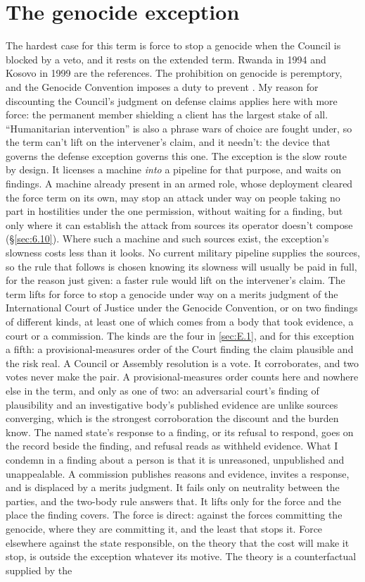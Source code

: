 \section{The genocide exception}
\label{sec:E.4}
The hardest case for this term is force to stop a genocide when the Council is blocked by a veto, and it rests on the extended term. Rwanda in 1994 and Kosovo in 1999 are the references. The prohibition on genocide is peremptory, and the Genocide Convention imposes a duty to prevent \autocite{icj2007bosnia}. My reason for discounting the Council's judgment on defense claims applies here with more force: the permanent member shielding a client has the largest stake of all. “Humanitarian intervention” is also a phrase wars of choice are fought under, so the term can't lift on the intervener's claim, and it needn't: the device that governs the defense exception governs this one. The exception is the slow route by design. It licenses a machine \emph{into} a pipeline for that purpose, and waits on findings. A machine already present in an armed role, whose deployment cleared the force term on its own, may stop an attack under way on people taking no part in hostilities under the one permission, without waiting for a finding, but only where it can establish the attack from sources its operator doesn't compose (\S\ref{sec:6.10}). Where such a machine and such sources exist, the exception's slowness costs less than it looks. No current military pipeline supplies the sources, so the rule that follows is chosen knowing its slowness will usually be paid in full, for the reason just given: a faster rule would lift on the intervener's claim. The term lifts for force to stop a genocide under way on a merits judgment of the International Court of Justice under the Genocide Convention, or on two findings of different kinds, at least one of which comes from a body that took evidence, a court or a commission. The kinds are the four in \ref{sec:E.1}, and for this exception a fifth: a provisional-measures order of the Court finding the claim plausible and the risk real. A Council or Assembly resolution is a vote. It corroborates, and two votes never make the pair. A provisional-measures order counts here and nowhere else in the term, and only as one of two: an adversarial court's finding of plausibility and an investigative body's published evidence are unlike sources converging, which is the strongest corroboration the discount and the burden know. The named state's response to a finding, or its refusal to respond, goes on the record beside the finding, and refusal reads as withheld evidence. What I condemn in a finding about a person is that it is unreasoned, unpublished and unappealable. A commission publishes reasons and evidence, invites a response, and is displaced by a merits judgment. It fails only on neutrality between the parties, and the two-body rule answers that. It lifts only for the force and the place the finding covers. The force is direct: against the forces committing the genocide, where they are committing it, and the least that stops it. Force elsewhere against the state responsible, on the theory that the cost will make it stop, is outside the exception whatever its motive. The theory is a counterfactual supplied by the 